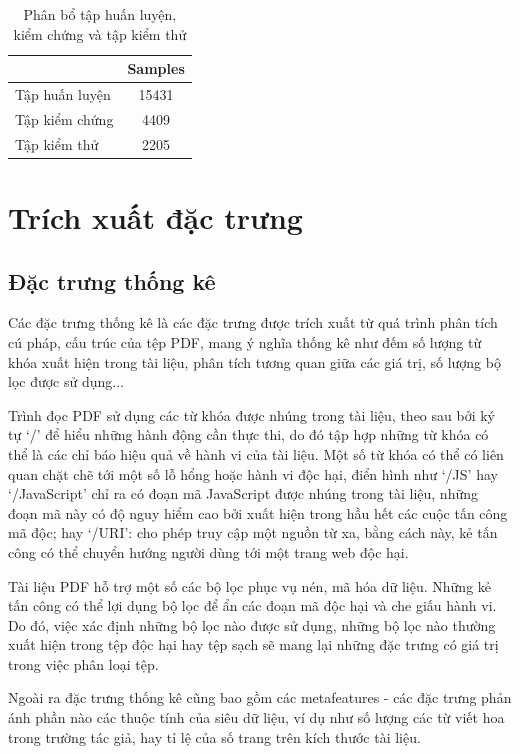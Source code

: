 \documentclass[./../main.tex]{subfiles}
\begin{document}
\begin{table}[]
	\centering
	\caption{Phân bổ tập huấn luyện, kiểm chứng và tập kiểm thử}
	\label{tab:phan_bo_tap_huan_luyen}
	\begin{tabular}{|l|c|}
		\hline
		               & Samples \\ \hline
		Tập huấn luyện & 15431   \\ \hline
		Tập kiểm chứng & 4409    \\ \hline
		Tập kiểm thử   & 2205    \\ \hline
	\end{tabular}
\end{table}

\section{Trích xuất đặc trưng}
\subsection{Đặc trưng thống kê}
Các đặc trưng thống kê là các đặc trưng được trích xuất từ quá trình phân tích cú pháp, cấu trúc của tệp PDF, mang ý nghĩa thống kê như đếm số lượng từ khóa xuất hiện trong tài liệu, phân tích tương quan giữa các giá trị, số lượng bộ lọc được sử dụng...

Trình đọc PDF sử dụng các từ khóa được nhúng trong tài liệu, theo sau bởi ký tự ‘\slash’ để hiểu những hành động cần thực thi, do đó tập hợp những từ khóa có thể là các chỉ báo hiệu quả về hành vi của tài liệu. Một số từ khóa có thể có liên quan chặt chẽ tới một số lỗ hổng hoặc hành vi độc hại, điển hình như ‘\slash JS’ hay ‘\slash JavaScript’ chỉ ra có đoạn mã JavaScript được nhúng trong tài liệu, những đoạn mã này có độ nguy hiểm cao bởi xuất hiện trong hầu hết các cuộc tấn công mã độc; hay ‘\slash URI’: cho phép truy cập một nguồn từ xa, bằng cách này, kẻ tấn công có thể chuyển hướng người dùng tới một trang web độc hại.

Tài liệu PDF hỗ trợ một số các bộ lọc phục vụ nén, mã hóa dữ liệu. Những kẻ tấn công có thể lợi dụng bộ lọc để ẩn các đoạn mã độc hại và che giấu hành vi. Do đó, việc xác định những bộ lọc nào được sử dụng, những bộ lọc nào thường xuất hiện trong tệp độc hại hay tệp sạch sẽ mang lại những đặc trưng có giá trị trong việc phân loại tệp.

Ngoài ra đặc trưng thống kê cũng bao gồm các metafeatures - các đặc trưng phản ánh phần nào các thuộc tính của siêu dữ liệu, ví dụ như số lượng các từ viết hoa trong trường tác giả, hay tỉ lệ của số trang trên kích thước tài liệu.
\end{document}

